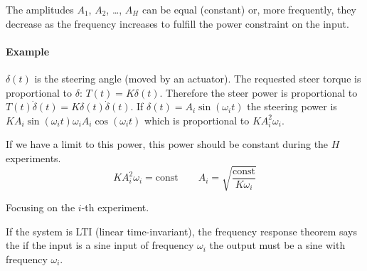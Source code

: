 \begin{remark}
    The amplitudes $A_1$, $A_2$, \ldots, $A_H$ can be equal (constant) or, more frequently, they decrease as the frequency increases to fulfill the power constraint on the input.

    \paragraph{Example} $\delta(t)$ is the steering angle (moved by an actuator).
    The requested steer torque is proportional to $\delta$: $T(t) = K \delta(t)$.
    Therefore the steer power is proportional to $T(t) \dot{\delta}(t) = K \delta(t)\dot{\delta}(t)$.
    If $\delta(t) = A_i\sin(\omega_it)$ the steering power is $KA_i\sin(\omega_it)\omega_iA_i\cos(\omega_it)$ which is proportional to $KA_i^2\omega_i$.

    If we have a limit to this power, this power should be constant during the $H$ experiments.
    \[KA_i^2\omega_i = \text{const} \qquad A_i=\sqrt{\frac{\text{const}}{K\omega_i}}\]
\end{remark}

Focusing on the $i$-th experiment.
\begin{figure}[H]
    \centering
\end{figure}

\begin{remark}
    If the system is LTI (linear time-invariant), the frequency response theorem says the if the input is a sine input of frequency $\omega_i$ the output must be a sine with frequency $\omega_i$.
\end{remark}

